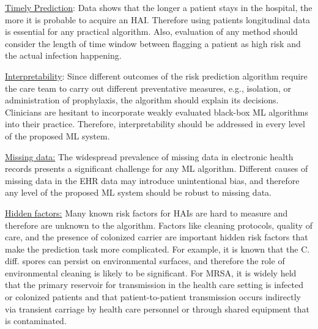 \underline{Timely Prediction}: Data shows that the longer a patient stays in the hospital, the more it is probable to acquire an HAI. Therefore using patients longitudinal data is essential for any practical algorithm. Also, evaluation of any method should consider the length of time window between flagging a patient as high risk and the actual infection happening.

\underline{Interpretability}: Since different outcomes of the risk prediction algorithm require the care team to carry out different preventative measures, e.g., isolation, or administration of prophylaxis, the algorithm should explain its decisions. Clinicians are hesitant to incorporate weakly evaluated black-box ML algorithms into their practice. Therefore, interpretability should be addressed in every level of the proposed ML system.

\underline{Missing data:}  The widespread prevalence of missing data in electronic health records presents a significant challenge for any ML algorithm. Different causes of missing data in the EHR data may introduce unintentional bias, and therefore any level of the proposed ML system should be robust to missing data.

\underline{Hidden factors:} Many known risk factors for HAIs are hard to measure and therefore are unknown to the algorithm. Factors like cleaning protocols, quality of care, and the presence of colonized carrier are important hidden risk factors that make the prediction task more complicated.  For example, it is known that the C. diff. spores can persist on environmental surfaces, and therefore the role of environmental cleaning is likely to be significant. For MRSA, it is widely held that the primary reservoir for transmission in the health care setting is infected or colonized patients and that patient-to-patient transmission occurs indirectly via transient carriage by health care personnel or through shared equipment that is contaminated.





